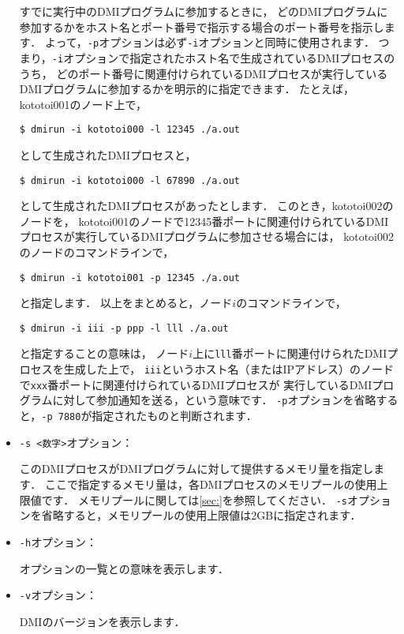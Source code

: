 \documentclass[report,12pt]{jsbook}
\begin{document}
\begin{itemize}
  すでに実行中のDMIプログラムに参加するときに，
  どのDMIプログラムに参加するかをホスト名とポート番号で指示する場合のポート番号を指示します．
  よって，\texttt{-p}オプションは必ず\texttt{-i}オプションと同時に使用されます．
  つまり，\texttt{-i}オプションで指定されたホスト名で生成されているDMIプロセスのうち，
  どのポート番号に関連付けられているDMIプロセスが実行しているDMIプログラムに参加するかを明示的に指定できます．
  たとえば，kototoi001のノード上で，
  \begin{codev}
\begin{verbatim}
$ dmirun -i kototoi000 -l 12345 ./a.out
\end{verbatim}
  \end{codev}%
  として生成されたDMIプロセスと，
  \begin{codev}
\begin{verbatim}
$ dmirun -i kototoi000 -l 67890 ./a.out
\end{verbatim}
  \end{codev}%
  として生成されたDMIプロセスがあったとします．
  このとき，kototoi002のノードを，
  kototoi001のノードで12345番ポートに関連付けられているDMIプロセスが実行しているDMIプログラムに参加させる場合には，
  kototoi002のノードのコマンドラインで，
  \begin{codev}
\begin{verbatim}
$ dmirun -i kototoi001 -p 12345 ./a.out
\end{verbatim}
  \end{codev}%
  と指定します．
  以上をまとめると，ノード$i$のコマンドラインで，
  \begin{codev}
\begin{verbatim}
$ dmirun -i iii -p ppp -l lll ./a.out
\end{verbatim}
  \end{codev}%
  と指定することの意味は，
  ノード$i$上に\texttt{lll}番ポートに関連付けられたDMIプロセスを生成した上で，
  \texttt{iii}というホスト名（またはIPアドレス）のノードで\texttt{xxx}番ポートに関連付けられているDMIプロセスが
  実行しているDMIプログラムに対して参加通知を送る，という意味です．
  \texttt{-p}オプションを省略すると，\texttt{-p 7880}が指定されたものと判断されます．
\item \texttt{-s <数字>}オプション：
  
  このDMIプロセスがDMIプログラムに対して提供するメモリ量を指定します．
  ここで指定するメモリ量は，各DMIプロセスのメモリプールの使用上限値です．
  メモリプールに関しては\ref{sec:}を参照してください．
  \texttt{-s}オプションを省略すると，メモリプールの使用上限値は2GBに指定されます．
\item \texttt{-h}オプション：
  
  オプションの一覧との意味を表示します．
\item \texttt{-v}オプション：
  
  DMIのバージョンを表示します．
\end{itemize}
\end{document}
